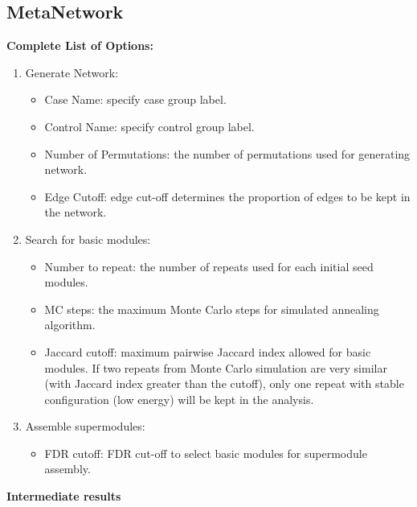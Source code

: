\subsection{MetaNetwork}
\label{sec:completeList_MetaNetwork}

\textbf{Complete List of Options:} 
\begin{enumerate}
\item Generate Network:
\begin{itemize}
\item Case Name: specify case group label.
\item Control Name: specify control group label.
\item Number of Permutations: the number of permutations used for generating network.
\item Edge Cutoff: edge cut-off  determines the proportion of edges to be kept in the network.
\end{itemize}

\item Search for basic modules:
\begin{itemize}
\item Number to repeat:  the number of repeats used for each initial seed modules.
\item MC steps:  the maximum Monte Carlo steps for simulated annealing algorithm.
\item Jaccard cutoff: maximum pairwise Jaccard index allowed for basic modules.
If two repeats from Monte Carlo simulation are very similar (with Jaccard index greater than the cutoff),
only one repeat with stable configuration (low energy) will be kept in the analysis.
\end{itemize}
\item Assemble supermodules:

\begin{itemize}
\item FDR cutoff:  FDR cut-off to select basic modules for supermodule assembly.
\end{itemize}
\end{enumerate}

\textbf{Intermediate results}
 
